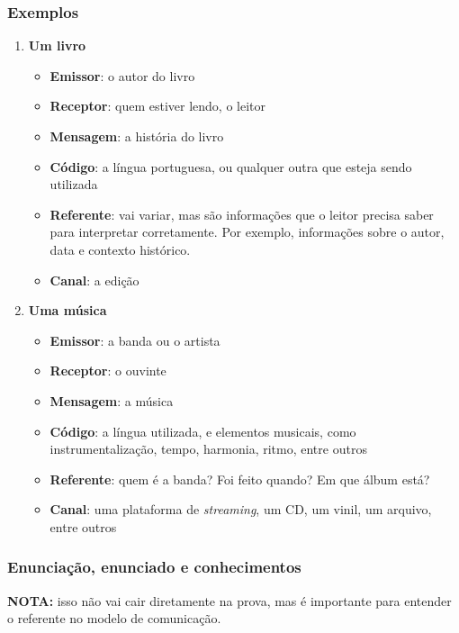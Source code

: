 \documentclass{article}
\begin{document}
\subsubsection{Exemplos}
\begin{enumerate}
    \item {
        \textbf{Um livro}
        \begin{itemize}
            \item {\textbf{Emissor}: o autor do livro}
            \item {\textbf{Receptor}: quem estiver lendo, o leitor}
            \item {\textbf{Mensagem}: a história do livro}
            \item {\textbf{Código}: a língua portuguesa, ou qualquer outra que esteja sendo utilizada}
            \item {\textbf{Referente}: vai variar, mas são informações que o leitor precisa saber para interpretar corretamente. Por exemplo, informações sobre o autor, data e contexto histórico.}
            \item {\textbf{Canal}: a edição}
        \end{itemize}
    }

    \item {
        \textbf{Uma música}
        \begin{itemize}
            \item {\textbf{Emissor}: a banda ou o artista}
            \item {\textbf{Receptor}: o ouvinte}
            \item {\textbf{Mensagem}: a música}
            \item {\textbf{Código}: a língua utilizada, e elementos musicais, como instrumentalização, tempo, harmonia, ritmo, entre outros}
            \item {\textbf{Referente}: quem é a banda? Foi feito quando? Em que álbum está?}
            \item {\textbf{Canal}: uma plataforma de \textit{streaming}, um CD, um vinil, um arquivo, entre outros}
        \end{itemize}
    }
\end{enumerate}

\subsubsection{Enunciação, enunciado e conhecimentos}
\textbf{NOTA:} isso não vai cair diretamente na prova, mas é importante para entender o referente no modelo de comunicação.
\end{document}
